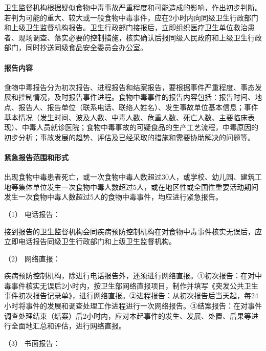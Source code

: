 卫生监督机构根据疑似食物中毒事故严重程度和可能造成的影响，作出初步判断。若判为可能的重大、较大或一般食物中毒事件，应在2小时内向同级卫生行政部门和上级卫生监督机构报告。卫生行政部门接报后，立即组织医疗卫生单位救治患者、现场调查、落实必要的控制措施，核实确认后报同级人民政府和上级卫生行政部门，同时抄送同级食品安全委员会办公室。

\paragraph{报告内容}

食物中毒报告分为初次报告、进程报告和结案报告，要根据事件严重程度、事态发展和控制情况，及时报告事件进程。食物中毒事件的报告内容包括：报告时间、地点、报告人、报告单位（联系电话、联络人姓名）、发生事故单位基本信息；事件基本情况（发生时间、波及人数、中毒人数、危重人数、死亡人数、主要临床表现）、中毒人员就诊医院；食物中毒事故的可疑食品的生产工艺流程，中毒原因的初步分析；事故发展的趋势、评估及已经采取的措施和需要协助解决的问题等。

\paragraph{紧急报告范围和形式}

出现食物中毒患者死亡，或一次食物中毒人数超过30人，或学校、幼儿园、建筑工地等集体单位发生一次食物中毒人数超过5人，或在地区性或全国性重要活动期间发生一次食物中毒人数超过5人的食物中毒事件，均应进行紧急报告。

\hypertarget{text00182.htmlux5cux23CHP5-10-1-7-4-1}{}
（1） 电话报告：

接到报告的卫生监督机构会同疾病预防控制机构在对食物中毒事件核实无误后，应立即电话报告同级卫生行政部门和上级卫生监督机构。

\hypertarget{text00182.htmlux5cux23CHP5-10-1-7-4-2}{}
（2） 网络直报：

疾病预防控制机构，除进行电话报告外，还须进行网络直报。①初次报告：在对中毒事件核实无误后2小时内，按卫生部网络直报项目，制作并填写《突发公共卫生事件初次报告记录单》，进行网络直报。②进程报告：从初次报告后当天起，每24小时将事件的发展和调查处理工作进程进行一次网络报告。③结案报告：在对事件调查处理结束（结案）后2小时内，应对本起事件的发生、发展、处置、后果等进行全面地汇总和评估，进行网络直报。

\hypertarget{text00182.htmlux5cux23CHP5-10-1-7-4-3}{}
（3） 书面报告：

